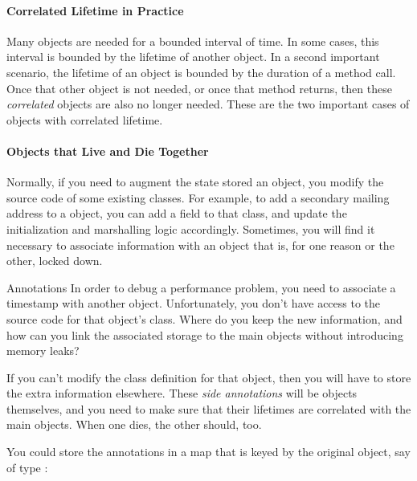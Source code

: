 
\paragraph{Correlated Lifetime in Practice}

Many objects are needed for a bounded interval of time. In some cases, this
interval is bounded by the lifetime of another object. In a second important
scenario, the lifetime of an object is bounded by the duration of a method call.
Once that other object is not needed, or once that method returns, then these
\emph{correlated} objects are also no longer needed. These are the two important
cases of objects with correlated lifetime.

\paragraph{Objects that Live and Die Together}
\label{sec:correlated-lifetime-1}

Normally, if you need to augment the state stored an object, you modify
the source code of some existing classes. For example, to add a secondary
mailing address to a  object, you can add a field to that class, and update the
initialization and marshalling logic accordingly. Sometimes, you will find it
necessary to associate information with an object that is, for one reason or the
other, locked down.

\begin{example}{Annotations}
In order to debug a performance problem, you need to associate a timestamp with
another object. Unfortunately, you don't have access to the source code for
that object's class. Where do you keep the new information, and how can you
link the associated storage to the main objects without introducing memory
leaks?
\end{example}

If you can't modify the class definition for that object, then you will have to
store the extra information elsewhere. These \emph{side annotations} will be objects themselves, and you need to make sure that their
lifetimes are correlated with the main objects. When one dies, the other
should, too.

You could store the annotations in a map that is keyed by the
original object, say of type :

